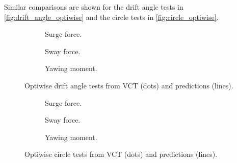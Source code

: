 Similar comparisons are shown for the drift angle tests in \autoref{fig:drift_angle_optiwise} and the circle tests in \autoref{fig:circle_optiwise}. 
\begin{figure}[h]
     \centering
     \begin{subfigure}[b]{0.32\textwidth}
         \centering
         
        \caption{Surge force.}
        \label{fig:drift_angle_X_optiwise}
     \end{subfigure}
     \hfill
     \begin{subfigure}[b]{0.32\textwidth}
         \centering
         
        \caption{Sway force.}
        \label{fig:drift_angle_Y_optiwise}
     \end{subfigure}
     \hfill
     \begin{subfigure}[b]{0.32\textwidth}
         \centering
         
        \caption{Yawing moment.}
        \label{fig:drift_angle_N_optiwise}
     \end{subfigure}
    \caption{Optiwise drift angle tests from VCT (dots) and predictions (lines).}
    \label{fig:drift_angle_optiwise}
\end{figure}
\begin{figure}[h]
     \centering
     \begin{subfigure}[b]{0.32\textwidth}
         \centering
         
        \caption{Surge force.}
        \label{fig:drift_angle_X_optiwise}
     \end{subfigure}
     \hfill
     \begin{subfigure}[b]{0.32\textwidth}
         \centering
         
        \caption{Sway force.}
        \label{fig:drift_angle_Y_optiwise}
     \end{subfigure}
     \hfill
     \begin{subfigure}[b]{0.32\textwidth}
         \centering
         
        \caption{Yawing moment.}
        \label{fig:drift_angle_N_optiwise}
     \end{subfigure}
    \caption{Optiwise circle tests from VCT (dots) and predictions (lines).}
    \label{fig:circle_optiwise}
\end{figure}

